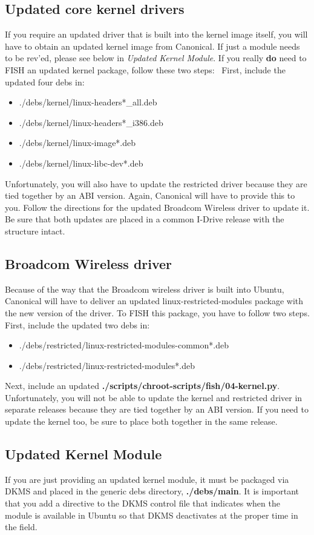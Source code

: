 \documentclass[letterpaper,10pt,titlepage]{article}
\begin{document}
\subsection{Updated core kernel drivers}
If you require an updated driver that is built into the kernel image itself, you will have to obtain an updated kernel image from Canonical.  If just a module needs to be rev'ed, please see below in \textit{Updated Kernel Module}.  If you really \textbf{do} need to FISH an updated kernel package, follow these two steps:
\
First, include the updated four debs in:
\begin{itemize}
\item ./debs/kernel/linux-headers*_all.deb
\item ./debs/kernel/linux-headers*_i386.deb
\item ./debs/kernel/linux-image*.deb
\item ./debs/kernel/linux-libc-dev*.deb
\end{itemize}
Unfortunately, you will also have to update the restricted driver because they are tied together by an ABI version.  Again, Canonical will have to provide this to you.  Follow the directions for the updated Broadcom Wireless driver to update it.  Be sure that both updates are placed in a common I-Drive release with the structure intact.

\subsection{Broadcom Wireless driver}
Because of the way that the Broadcom wireless driver is built into Ubuntu, Canonical will have to deliver an updated linux-restricted-modules package with the new version of the driver.  To FISH this package, you have to follow two steps.
\\
First, include the updated two debs in:
\begin{itemize}
\item ./debs/restricted/linux-restricted-modules-common*.deb
\item ./debs/restricted/linux-restricted-modules*.deb
\end{itemize}
Next, include an updated \textbf{./scripts/chroot-scripts/fish/04-kernel.py}.  Unfortunately, you will not be able to update the kernel and restricted driver in separate releases because they are tied together by an ABI version.  If you need to update the kernel too, be sure to place both together in the same release.

\subsection{Updated Kernel Module}
If you are just providing an updated kernel module, it must be packaged via DKMS and placed in the generic debs directory, \textbf{./debs/main}.  It is important that you add a directive to the DKMS control file that indicates when the module is available in Ubuntu so that DKMS deactivates at the proper time in the field.
\end{document}
